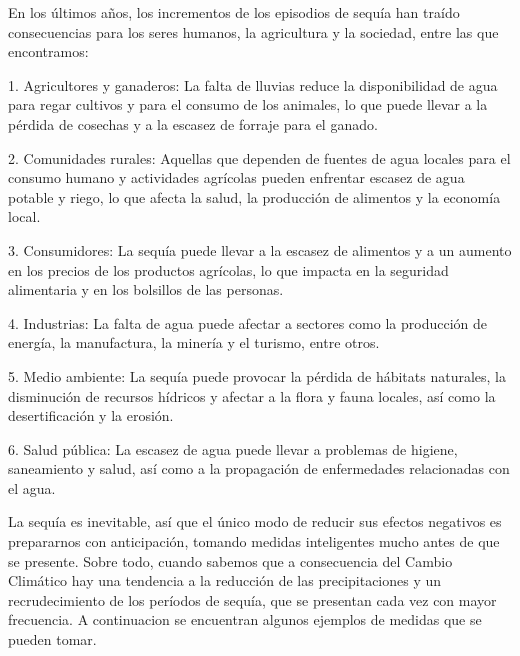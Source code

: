 \documentclass[12pt]{article}
\begin{document}
    En los últimos años, los incrementos de los episodios de sequía han traído consecuencias para los seres humanos, la agricultura y la sociedad, entre las que encontramos:
    \par\vspace{4mm}
    1. Agricultores y ganaderos: La falta de lluvias reduce la disponibilidad de agua para regar cultivos y para el consumo de los animales, lo que puede llevar a la pérdida de cosechas y a la escasez de forraje para el ganado.
    \par\vspace{4mm}
    2. Comunidades rurales: Aquellas que dependen de fuentes de agua locales para el consumo humano y actividades agrícolas pueden enfrentar escasez de agua potable y riego, lo que afecta la salud, la producción de alimentos y la economía local.
    \par\vspace{4mm}
    3. Consumidores: La sequía puede llevar a la escasez de alimentos y a un aumento en los precios de los productos agrícolas, lo que impacta en la seguridad alimentaria y en los bolsillos de las personas.
    \par\vspace{4mm}
    4. Industrias: La falta de agua puede afectar a sectores como la producción de energía, la manufactura, la minería y el turismo, entre otros.
    \par\vspace{4mm}
    5. Medio ambiente: La sequía puede provocar la pérdida de hábitats naturales, la disminución de recursos hídricos y afectar a la flora y fauna locales, así como la desertificación y la erosión.
    \par\vspace{4mm}
    6. Salud pública: La escasez de agua puede llevar a problemas de higiene, saneamiento y salud, así como a la propagación de enfermedades relacionadas con el agua.
    \par\vspace{4mm}
    La sequía es inevitable, así que el único modo de reducir sus efectos negativos es prepararnos con anticipación, tomando medidas inteligentes mucho antes de que se presente. Sobre todo, cuando sabemos que a consecuencia del Cambio Climático hay una tendencia a la reducción de las precipitaciones y un recrudecimiento de los períodos de sequía, que se presentan cada vez con mayor frecuencia. A continuacion se encuentran algunos ejemplos de medidas que se pueden tomar.
\end{document}
